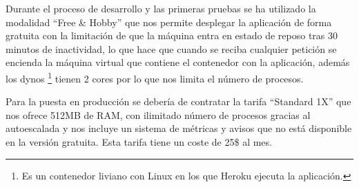 Durante el proceso de desarrollo y las primeras pruebas se ha utilizado la modalidad ``Free
\& Hobby'' que nos permite desplegar la aplicación de forma gratuita con la limitación de
que la máquina entra en estado de reposo tras 30 minutos de inactividad, lo que
hace que cuando se reciba cualquier petición se encienda la máquina virtual que contiene
el contenedor con la aplicación, además los dynos \footnote{Es un contenedor liviano con Linux en los que Heroku ejecuta la
aplicación.}
tienen 2 cores por lo que nos limita el número de procesos.

Para la puesta en producción se debería de contratar la tarifa ``Standard 1X'' que nos ofrece
512MB de RAM, con ilimitado número de procesos gracias al autoescalada y nos incluye un
sistema de métricas y avisos que no está disponible en la versión gratuita. Esta tarifa
tiene un coste de 25\$ al mes.
